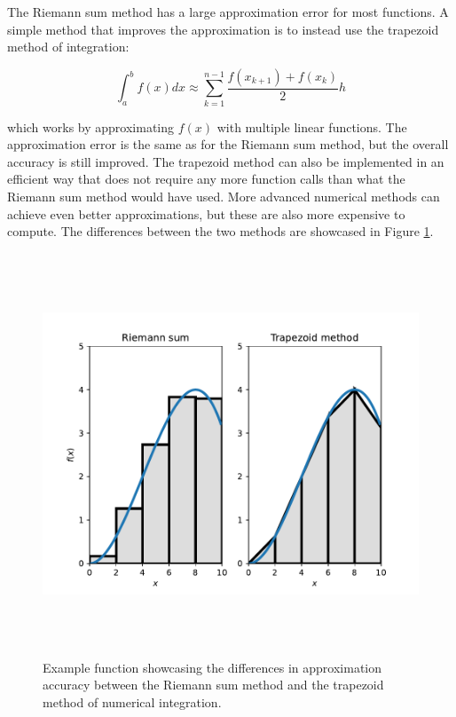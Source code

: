 \documentclass[12pt,a4paper]{book}
\begin{document}
The Riemann sum method has a large approximation error for most functions. A simple method that improves the approximation is to instead use the trapezoid method of integration:

\begin{equation}
    \int_a^b f(x) dx \approx \sum_{k=1}^{n - 1} \frac{f(x_{k+1}) + f(x_k)}{2} h
\end{equation}

\noindent which works by approximating $f(x)$ with multiple linear functions. The approximation error is the same as for the Riemann sum method, but the overall accuracy is still improved. The trapezoid method can also be implemented in an efficient way that does not require any more function calls than what the Riemann sum method would have used. More advanced numerical methods can achieve even better approximations, but these are also more expensive to compute. The differences between the two methods are showcased in Figure \ref{fig:numericalintegration}.

\begin{figure}[H]
    \centering
    \includegraphics[height=12cm]{figs/plots/motion_classification/numericalintegration.pdf}
    \caption{Example function showcasing the differences in approximation accuracy between the Riemann sum method and the trapezoid method of numerical integration.}
    \label{fig:numericalintegration}
\end{figure}
\end{document}
